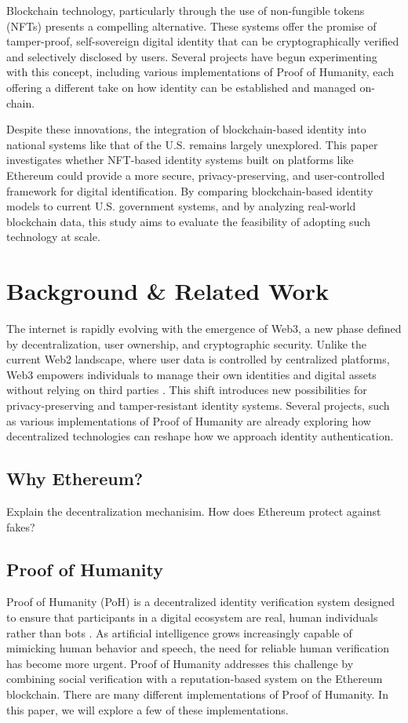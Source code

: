 \documentclass[conference]{IEEEtran}
\begin{document}
Blockchain technology, particularly through the use of non-fungible tokens (NFTs) presents a compelling alternative. These systems offer the promise of tamper-proof, self-sovereign digital identity that can be cryptographically verified and selectively disclosed by users. Several projects have begun experimenting with this concept, including various implementations of Proof of Humanity, each offering a different take on how identity can be established and managed on-chain.

Despite these innovations, the integration of blockchain-based identity into national systems like that of the U.S. remains largely unexplored. This paper investigates whether NFT-based identity systems built on platforms like Ethereum could provide a more secure, privacy-preserving, and user-controlled framework for digital identification. By comparing blockchain-based identity models to current U.S. government systems, and by analyzing real-world blockchain data, this study aims to evaluate the feasibility of adopting such technology at scale.


\section{Background \& Related Work}
The internet is rapidly evolving with the emergence of Web3, a new phase defined by decentralization, user ownership, and cryptographic security. Unlike the current Web2 landscape, where user data is controlled by centralized platforms, Web3 empowers individuals to manage their own identities and digital assets without relying on third parties \cite{what-is-web3}. This shift introduces new possibilities for privacy-preserving and tamper-resistant identity systems. Several projects, such as various implementations of Proof of Humanity are already exploring how decentralized technologies can reshape how we approach identity authentication.

\subsection{Why Ethereum?}
Explain the decentralization mechanisim. How does Ethereum protect against fakes?

\subsection{Proof of Humanity}
Proof of Humanity (PoH) is a decentralized identity verification system designed to ensure that participants in a digital ecosystem are real, human individuals rather than bots \cite{what-is-poh}. As artificial intelligence grows increasingly capable of mimicking human behavior and speech, the need for reliable human verification has become more urgent. Proof of Humanity addresses this challenge by combining social verification with a reputation-based system on the Ethereum blockchain. There are many different implementations of Proof of Humanity. In this paper, we will explore a few of these implementations. 
\end{document}
